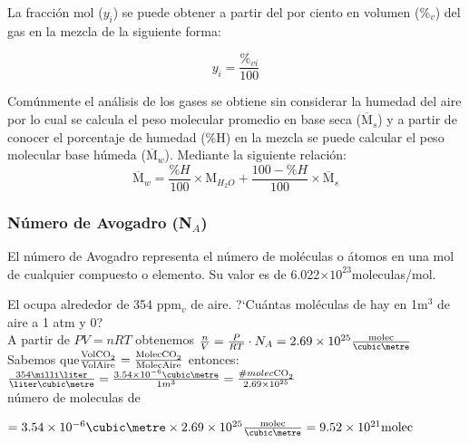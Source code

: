 La fracci\'on mol ($y_i$) se puede obtener a partir del por ciento en volumen (\%$_v$) del gas en la mezcla de la siguiente forma:

\begin{equation}
y_i = \frac{\%_{vi} }{100} 
\label{fraccion}
\end{equation}

Com\'unmente el an\'alisis de los gases se obtiene sin considerar la humedad del aire por lo cual se calcula el peso molecular promedio en base seca ($\overline{\textrm{M}}_s$) y a partir de conocer el porcentaje de humedad (\%H) en la mezcla se puede calcular el peso molecular base h\'umeda ($\overline{\textrm{M}}_w$). Mediante la siguiente relaci\'on:
\begin{equation}
\overline{\textrm{M}}_w= \frac{\%H}{100}\times \textrm{M}_{H_2O} +
\frac{100-\%H}{100} \times \overline{\textrm{M}}_s
\label{hum}
\end{equation}

\subsubsection{N\'umero de Avogadro (N$_A$)}
 
 El n\'umero de Avogadro representa el n\'umero de mol\'e\-culas o \'atomos en una mol de cualquier compuesto o elemento. Su valor es de 6.022$\times10^{23}$moleculas/mol.
 
\begin{example}%
 El  ocupa alrededor de 354 ppm$_v$ de aire. ?`Cu\'antas mol\'eculas de  hay en 1m$^3$ de aire a 1 atm y 0\celsius?\\
 A partir de $PV =nRT$  obtenemos $\frac{n}{V}=\frac{P}{RT}\cdot N_A=2.69\times10^{25} \frac{\textrm{molec}}{\cubic\metre}$\\
 Sabemos que$ \frac{\ce{Vol CO2}}{\ce{Vol Aire}}=\frac{\ce{Molec CO2}}{\ce{Molec Aire}}$ entonces:\\
\quad $\frac{354 \milli\liter}{\liter \cubic\metre}=\frac{3.54\times10^{-6}\cubic\metre}{1m^3}=\frac{\# molec \ce{CO2}}{2.69\times10^{25}}$\\
\quad n\'umero de moleculas de 

$=3.54\times10^{-6}\cubic\metre\times2.69\times10^{25}\frac{\textrm{molec}}{\cubic\metre} =9.52\times10^{21}\textrm{molec}$\\
\end{example}
 
